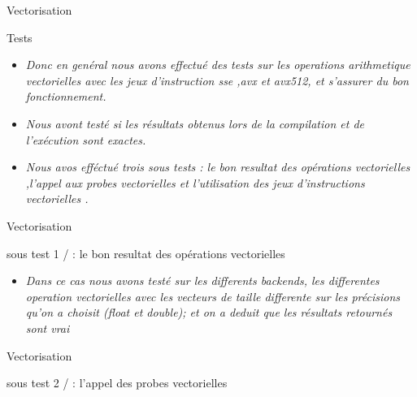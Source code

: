 \documentclass{beamer}
\begin{document}
\begin{frame}{Vectorisation}
\begin{block}{Tests}
      \begin{itemize}
        \item\textit{Donc en genéral nous avons effectué des tests sur les operations arithmetique vectorielles avec les jeux d'instruction sse ,avx et avx512, et s'assurer du bon fonctionnement. } 
         \item\textit{Nous avont testé si les résultats obtenus lors de la compilation et de l’exécution sont exactes.} 
        
         \item \textit{Nous avos efféctué trois sous tests : le bon resultat des opérations vectorielles ,l'appel aux probes vectorielles et l'utilisation des jeux d'instructions vectorielles .}  
         
         \end{itemize}
\end{block}


         \end{frame}
\begin{frame}{Vectorisation} 
\begin{block}{sous test 1 / : le bon resultat des opérations vectorielles}
 \begin{itemize}
        \item\textit{Dans ce cas nous avons testé sur les differents backends, les differentes operation vectorielles avec les vecteurs de taille differente sur les précisions qu'on a choisit (float et double);
        et on a deduit que les résultats retournés sont vrai
        } 
        \end{itemize}   
\end{block}
\end{frame}

\begin{frame}{Vectorisation}
\begin{block}{sous test 2 / : l'appel des probes vectorielles}
\end{block}

  
        
\end{frame}
\end{document}
